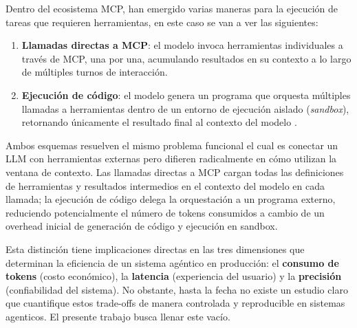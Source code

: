 Dentro del ecosistema MCP, han emergido varias maneras
para la ejecución de tareas que requieren herramientas, en este caso se van a ver las siguientes:

\begin{enumerate}
    \item \textbf{Llamadas directas a MCP}: el modelo invoca
    herramientas individuales a través de MCP, una por una, acumulando
    resultados en su contexto a lo largo de múltiples turnos de interacción.

    \item \textbf{Ejecución de código}: el modelo genera un programa que orquesta múltiples llamadas a herramientas
    dentro de un entorno de ejecución aislado (\textit{sandbox}), retornando
    únicamente el resultado final al contexto del modelo
    \citep{anthropic2024codeexec}.
\end{enumerate}

Ambos esquemas resuelven el mismo problema funcional el cual es conectar un LLM con
herramientas externas pero difieren radicalmente en cómo utilizan la ventana
de contexto. Las llamadas directas a MCP cargan todas las definiciones de herramientas
y resultados intermedios en el contexto del modelo en cada llamada; la ejecución de código
delega la orquestación a un programa externo, reduciendo potencialmente el
número de tokens consumidos a cambio de un overhead inicial de generación de
código y ejecución en sandbox.

Esta distinción tiene implicaciones directas en las tres dimensiones que
determinan la eficiencia de un sistema agéntico en producción: el
\textbf{consumo de tokens} (costo económico), la \textbf{latencia} (experiencia
del usuario) y la \textbf{precisión} (confiabilidad del sistema). No obstante,
hasta la fecha no existe un estudio claro que cuantifique estos trade-offs
de manera controlada y reproducible en sistemas agenticos. El presente trabajo busca llenar este vacío.
